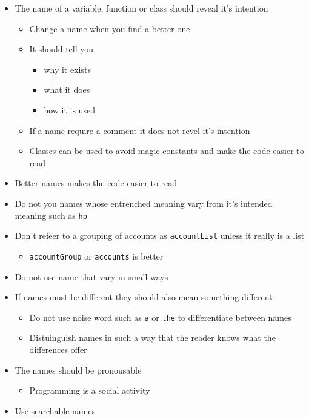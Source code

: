 \documentclass[11pt]{article}
\providecommand{\tightlist}{%
      \setlength{\itemsep}{0pt}\setlength{\parskip}{0pt}}
\begin{document}
\begin{itemize}
\tightlist
\item
  The name of a variable, function or class should reveal it's intention

  \begin{itemize}
  \tightlist
  \item
    Change a name when you find a better one
  \item
    It should tell you

    \begin{itemize}
    \tightlist
    \item
      why it exists
    \item
      what it does
    \item
      how it is used
    \end{itemize}
  \item
    If a name require a comment it does not revel it's intention
  \item
    Classes can be used to avoid magic constants and make the code
    easier to read
  \end{itemize}
\item
  Better names makes the code easier to read
\item
  Do not you names whose entrenched meaning vary from it's intended
  meaning such as \texttt{hp}
\item
  Don't refeer to a grouping of accounts as \texttt{accountList} unless
  it really is a list

  \begin{itemize}
  \tightlist
  \item
    \texttt{accountGroup} or \texttt{accounts} is better
  \end{itemize}
\item
  Do not use name that vary in small ways
\item
  If names must be different they should also mean something different

  \begin{itemize}
  \tightlist
  \item
    Do not use noise word such as \texttt{a} or \texttt{the} to
    differentiate between names
  \item
    Distuinguish names in such a way that the reader knows what the
    differences offer
  \end{itemize}
\item
  The names should be pronousable

  \begin{itemize}
  \tightlist
  \item
    Programming is a social activity
  \end{itemize}
\item
  Use searchable names


\end{itemize}
\end{document}
